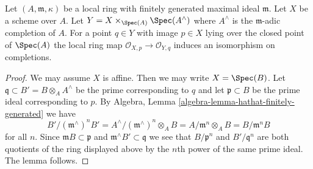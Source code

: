 \begin{lemma}
\label{lemma-iso-completions}
Let $(A, \mathfrak m, \kappa)$ be a local ring with finitely generated
maximal ideal $\mathfrak m$. Let $X$ be a scheme over $A$.
Let $Y = X \times_{\Spec(A)} \Spec(A^\wedge)$ where
$A^\wedge$ is the $\mathfrak m$-adic completion of $A$.
For a point $q \in Y$ with image $p \in X$ lying
over the closed point of $\Spec(A)$ the
local ring map $\mathcal{O}_{X, p} \to \mathcal{O}_{Y, q}$
induces an isomorphism on completions.
\end{lemma}

\begin{proof}
We may assume $X$ is affine. Then we may write $X = \Spec(B)$.
Let $\mathfrak q \subset B' = B \otimes_A A^\wedge$ be the
prime corresponding to $q$ and let $\mathfrak p \subset B$
be the prime ideal corresponding to $p$.
By Algebra, Lemma \ref{algebra-lemma-hathat-finitely-generated}
we have
$$
B'/(\mathfrak m^\wedge)^n B' =
A^\wedge/(\mathfrak m^\wedge)^n \otimes_A B =
A/\mathfrak m^n \otimes_A B = B/\mathfrak m^n B
$$
for all $n$. Since $\mathfrak m B \subset \mathfrak p$ and
$\mathfrak m^\wedge B' \subset \mathfrak q$ we see that
$B/\mathfrak p^n$ and $B'/\mathfrak q^n$ are both
quotients of the ring displayed above by the $n$th power
of the same prime ideal. The lemma follows.
\end{proof}
